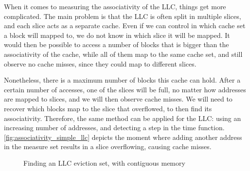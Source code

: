 \documentclass[a4paper,11pt,oneside]{report}
\begin{document}
When it comes to measuring the associativity of the LLC, things get more complicated. The main problem is that the LLC is often split in multiple slices, and each slice acts as a separate cache. Even if we can control in which cache set a block will mapped to, we do not know in which slice it will be mapped. It would then be possible to access a number of blocks that is bigger than the associativity of the cache, while all of them map to the same cache set, and still observe no cache misses, since they could map to different slices.

Nonetheless, there is a maximum number of blocks this cache can hold. After a certain number of accesses, one of the slices will be full, no matter how addresses are mapped to slices, and we will then observe cache misses. We will need to recover which blocks map to the slice that overflowed, to then find its associativity. Therefore, the same method can be applied for the LLC: using an increasing number of addresses, and detecting a step in the time function. \autoref{fig:associativity_simple_llc} depicts the moment where adding another address in the measure set results in a slice overflowing, causing cache misses.

\begin{figure}
    \centering
    \caption{Finding an LLC eviction set, with contiguous memory}
    \label{fig:associativity_simple_llc}
\end{figure}
\end{document}
